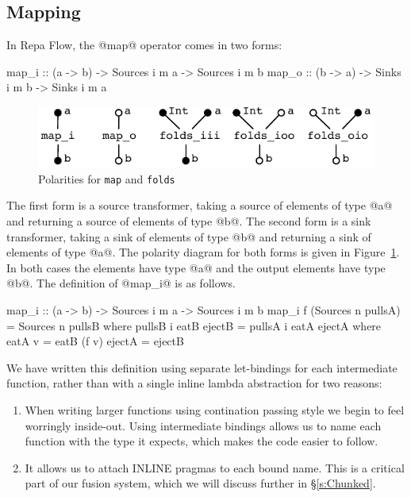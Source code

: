 \subsection{Mapping}
In Repa Flow, the @map@ operator comes in two forms:
\begin{code}
map_i :: (a -> b) -> Sources i m a -> Sources i m b
map_o :: (b -> a) -> Sinks   i m b -> Sinks   i m a
\end{code}

\begin{figure}
\begin{center}
\includegraphics[scale=0.8]{figures/maps.pdf}
\end{center}
\vspace{-0.5em}
\caption{Polarities for \texttt{map} and \texttt{folds}}
\label{f:Map}
\end{figure}

The first form is a source transformer, taking a source of elements of type @a@ and returning a source of elements of type @b@. The second form is a sink transformer, taking a sink of elements of type @b@ and returning a sink of elements of type @a@. The polarity diagram for both forms is given in Figure~\ref{f:Map}. In both cases the elements have type @a@ and the output elements have type @b@. The definition of @map_i@ is as follows. 
\begin{code}
map_i :: (a -> b) -> Sources i m a -> Sources i m b
map_i f (Sources n pullsA)
 = Sources n pullsB
 where  pullsB i eatB ejectB
         = pullsA i eatA ejectA
         where  eatA v = eatB (f v)
                ejectA = ejectB
\end{code}

We have written this definition using separate let-bindings for each intermediate function, rather than with a single inline lambda abstraction for two reasons:

\begin{enumerate}
\item When writing larger functions using contination passing style we begin to feel worringly inside-out. Using intermediate bindings allows us to name each function with the type it expects, which makes the code easier to follow.
\item It allows us to attach INLINE pragmas to each bound name. This is a critical part of our fusion system, which we will discuss further in \S\ref{s:Chunked}.
\end{enumerate}

